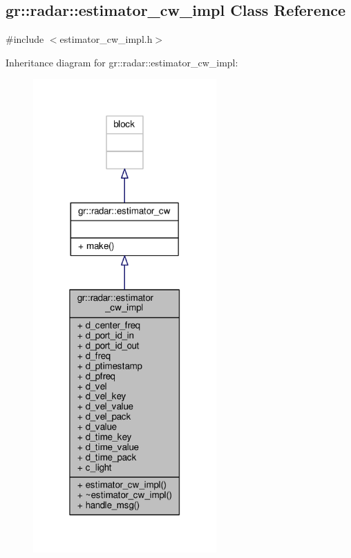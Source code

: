 \subsection{gr\+:\+:radar\+:\+:estimator\+\_\+cw\+\_\+impl Class Reference}
\label{classgr_1_1radar_1_1estimator__cw__impl}


{\ttfamily \#include $<$estimator\+\_\+cw\+\_\+impl.\+h$>$}



Inheritance diagram for gr\+:\+:radar\+:\+:estimator\+\_\+cw\+\_\+impl\+:
\nopagebreak
\begin{figure}[H]
\begin{center}
\leavevmode
\includegraphics[width=199pt]{dc/d43/classgr_1_1radar_1_1estimator__cw__impl__inherit__graph}
\end{center}
\end{figure}


